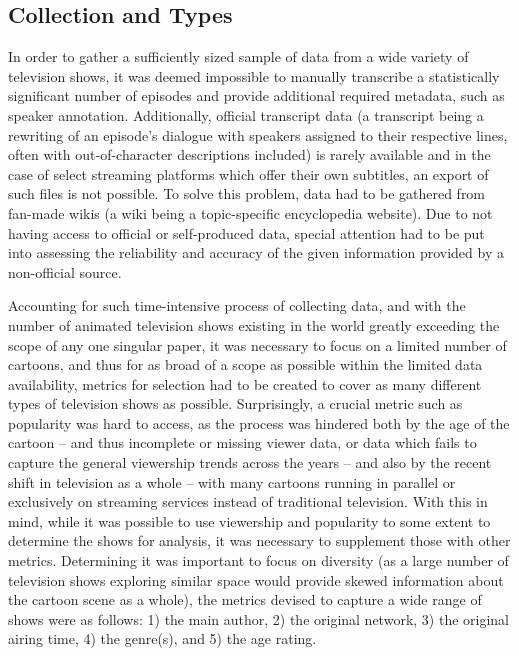 \documentclass[a4paper, 11pt]{article}
\begin{document}
\subsection{Collection and Types} \label{dat:col}
In order to gather a sufficiently sized sample of data from a wide variety of television shows, it was deemed impossible to manually transcribe a statistically significant number of episodes and provide additional required metadata, such as speaker annotation. Additionally, official transcript data (a transcript being a rewriting of an episode's dialogue with speakers assigned to their respective lines, often with out-of-character descriptions included) is rarely available and in the case of select streaming platforms which offer their own subtitles, an export of such files is not possible. To solve this problem, data had to be gathered from fan-made wikis (a wiki being a topic-specific encyclopedia website). Due to not having access to official or self-produced data, special attention had to be put into assessing the reliability and accuracy of the given information provided by a non-official source.

Accounting for such time-intensive process of collecting data, and with the number of animated television shows existing in the world greatly exceeding the scope of any one singular paper, it was necessary to focus on a limited number of cartoons, and thus for as broad of a scope as possible within the limited data availability, metrics for selection had to be created to cover as many different types of television shows as possible. Surprisingly, a crucial metric such as popularity was hard to access, as the process was hindered both by the age of the cartoon -- and thus incomplete or missing viewer data, or data which fails to capture the general viewership trends across the years -- and also by the recent shift in television as a whole -- with many cartoons running in parallel or exclusively on streaming services instead of traditional television. With this in mind, while it was possible to use viewership and popularity to some extent to determine the shows for analysis, it was necessary to supplement those with other metrics. Determining it was important to focus on diversity (as a large number of television shows exploring similar space would provide skewed information about the cartoon scene as a whole), the metrics devised to capture a wide range of shows were as follows: 1) the main author, 2) the original network, 3) the original airing time, 4) the genre(s), and 5) the age rating.
\end{document}
